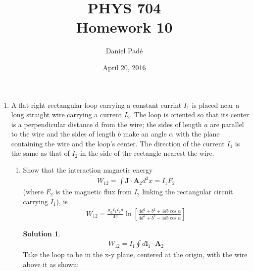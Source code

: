 \documentclass[letter,12pt]{article}
\title{PHYS 704 \\ Homework 10}
\author{Daniel Pad\'e}
\date{April 20, 2016}
\theoremstyle{definition}
\newtheorem*{sol}{Solution}
\begin{document}
\newcommand{\bs}[1]{\boldsymbol{#1}}
\maketitle
\begin{enumerate}
    \item
        A flat right rectangular loop carrying a constant currint
        $I_1$ is placed near a long straight wire carrying a current
        $I_2$. The loop is oriented so that its center is a
        perpendicular distance d from the wire; the sides of length
        $a$ are parallel to the wire and the sides of length $b$ make
        an angle $\alpha$ with the plane containing the wire and the
        loop's center. The direction of the current $I_1$ is the same
        as that of $I_2$ in the side of the rectangle nearest the
        wire.
        \begin{enumerate}
            \item
                Show that the interaction magnetic energy
                \begin{align*}
                    W_{12} = \int \bs{J} \cdot \bs{A}_2 d^3x = I_1 F_2
                \end{align*}
                (where $F_2$ is the magnetic flux from $I_2$ linking
                the rectangular circuit carrying $I_1$), is
                \begin{align*}
                    W_{12} =
                    \frac{\mu_0 I_1 I_2 a} {4 \pi}
                    \ln
                    \left[
                        \frac
                        {4d^2 + b^2 + 4db \cos \alpha}
                        {4d^2 + b^2 - 4db \cos \alpha}
                    \right]
                \end{align*}
                \begin{sol}
                    \begin{align*}
                        W_{12} = I_1 \oint d\bs{l}_1 \cdot \bs{A}_2
                    \end{align*}
                    Take the loop to be in the x-y plane, centered at
                    the origin, with the wire above it as shown: \\
                    \begin{figure}[H]
\end{figure}
\end{sol}
\end{enumerate}
\end{enumerate}
\end{document}
